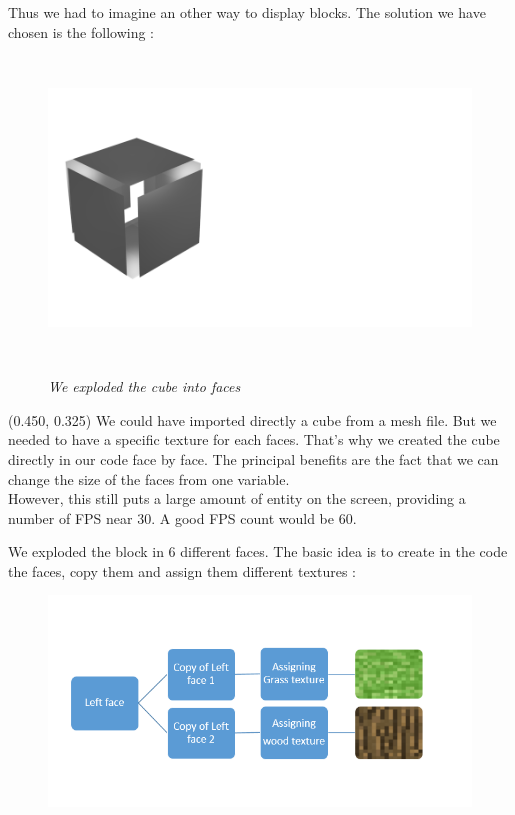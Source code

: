 \documentclass[article]{report} %
\begin{document}
				Thus we had to imagine an other way to display blocks. The solution we have chosen is the following :
 				\begin{figure}[h]
					\includegraphics[width=16cm, height = 8cm]{images/Schemas/ExplodedCube01.png}
					\begin{center}\it We exploded the cube into faces \end{center}
				\end{figure}
				\begin{textblock}{0.428}(0.450, 0.325)
					\noindent  We could have imported directly a cube from a mesh file. But we needed to have a specific texture for each faces. That's why we created the cube directly in our code face by face. The principal benefits are the fact that we can change the size of the faces from one variable.\\

 However, this still puts a large amount of entity on the screen, providing a number of FPS near 30. A good FPS count would be 60.
			\end{textblock}
			
			We exploded the block in 6 different faces. The basic idea is to create in the code the faces, copy them and assign them different textures : 
			\begin{figure}[h]
					\includegraphics[scale=0.7]{images/Schemas/Display.png}
			\end{figure}
\end{document}

